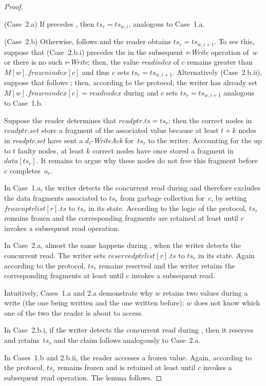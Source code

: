 \documentclass[oribibl]{llncs}
\theoremstyle{definition-boldhead}
\newcommand{\var}[1]{\textit{#1}}
\newcommand{\op}[1]{\textsl{#1}}
\newcommand{\nodes}{nodes\xspace}
\begin{document}
\begin{proof}
\begin{description}
    (Case~2.a) If \scanrd precedes , then $\var{ts}_r =
    \var{ts}_{w,i}$, analogous to Case~1.a.

    (Case~2.b) Otherwise, \scanrd follows  and the
    reader obtains $\var{ts}_r = \var{ts}_{w,i+1}$.  To see this,
    suppose that (Case~2.b.i) \scanrd precedes the  in
    the subsequent \var{r}-\op{Write} operation of~$w$ or there is no
    such \var{r}-\op{Write}; then, the value \var{readindex} of $c$
    remains greater than $M[w].\var{frozenindex}[c]$ and thus $c$ sets
    $\var{ts}_r = \var{ts}_{w,i+1}$.  Alternatively (Case~2.b.ii),
    suppose that \scanrd follows ; then, according to
    the protocol, the writer has already set $M[w].\var{frozenindex}[c] =
    \var{readindex}$ during  and $c$ sets $\var{ts}_r =
    \var{ts}_{w,i+1}$ analogous to Case~1.b.
  \end{description}

  Suppose the reader determines that $\var{readptr}.\var{ts} =
  \var{ts}_r$; then the correct \nodes in $\var{readptr}.\var{set}$
  store a fragment of the associated value because at least $t + k$
  \nodes in \var{readptr}.\var{set} have sent a
  \var{$d_i$}-\op{WriteAck} for~$\var{ts}_r$ to the writer.
  Accounting for the up to $t$ faulty \nodes, at least $k$ correct
  \nodes have once stored a fragment in $\var{data}[\var{ts}_r]$.
It remains to argue why these \nodes do not free this fragment
  before $c$ completes~$o_r$.

  In Case~1.a, the writer detects the concurrent read during 
  and therefore excludes the data fragments associated to $\var{ts}_r$
  from garbage collection for~$c$, by setting
   $\var{frozenptrlist}[r].\var{ts}$ to $\var{ts}_r$ in its state.
  According to the logic of the protocol, $\var{ts}_r$ remains frozen
  and the corresponding fragments are retained at least until $c$ invokes
  a subsequent read operation.


  In Case~2.a, almost the same happens during , when the
  writer detects the concurrent read.  The writer sets
  $\var{reservedptrlist}[r].\var{ts}$ to $\var{ts}_r$ in its state.
  Again according to the protocol, $\var{ts}_r$ remains reserved and
  the writer retains the corresponding fragments at least until $c$
  invokes a subsequent read.

Intuitively, Cases~1.a and 2.a demonstrate why $w$ retains two
  values during a write (the one being written and the one written
  before): $w$ does not know which one of the two the reader is about
  to access.

  In Case~2.b.i, if the writer detects the concurrent read during
  , then it reserves and retains~$\var{ts}_r$ and the claim
  follows analogously to Case~2.a.

  In Cases~1.b and 2.b.ii, the reader accesses a frozen value.  Again,
  according to the protocol, $\var{ts}_r$ remains frozen and is retained
  at least until $c$ invokes a subsequent read operation.  The lemma follows.
\end{proof}
\fi
\end{document}
